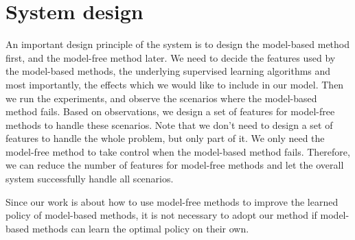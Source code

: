 

\section{System design}


An important design principle of the system is to design the model-based method first,
and the model-free method later. 
We need to decide the features used by the
model-based methods, the underlying supervised learning algorithms and most
importantly, the effects which we would like to include in our model. Then we
run the experiments, and observe the scenarios where the model-based method fails. 
Based on observations, we design a set of features for model-free methods to handle
these scenarios. Note that we don't need to design a set of features to handle
the whole problem, but only part of it. We only need the model-free method
to take control when the model-based method fails. Therefore, we can reduce the
number of features for model-free methods and let the overall system
successfully handle all scenarios.


Since our work is about how to use model-free methods to improve the learned policy of model-based methods,
it is not necessary to adopt our method if model-based methods can learn the optimal policy
on their own.


